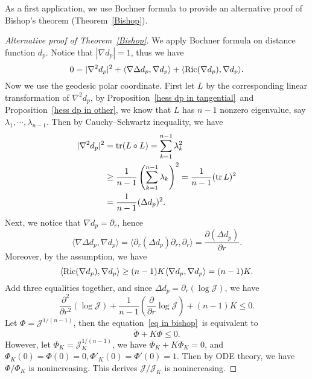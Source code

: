 As a first application, we use Bochner formula to provide an alternative proof of Bishop's theorem (Theorem~\ref{Bishop}).
\begin{proof}[Alternative proof of Theorem~\ref{Bishop}]
    We apply Bochner formula on distance function $d_p$.
    Notice that $|\nabla d_p|=1$, thus we have
    \[0=|\nabla^2d_p|^2+\langle\nabla\Delta d_p,\nabla d_p\rangle+\langle\operatorname{Ric}(\nabla d_p),\nabla d_p\rangle.\]
    Now we use the geodesic polar coordinate.
    First let $L$ by the corresponding linear transformation of $\nabla^2d_p$, by Proposition~\ref{hess dp in tangential}~and Proposition~\ref{hess dp in other}, we know that $L$ has $n-1$ nonzero eigenvalue, say $\lambda_1,\cdots,\lambda_{n-1}$.
    Then by Cauchy--Schwartz inequality, we have
    \begin{align*}
        |\nabla^2d_p|^2&=\operatorname{tr}(L\circ L)=\sum_{k=1}^{n-1}\lambda^2_k\\
        &\geq\frac{1}{n-1}\left(\sum_{k=1}^{n-1}\lambda_k\right)^2=\frac{1}{n-1}(\operatorname{tr} L)^2\\
        &=\frac{1}{n-1}(\Delta d_p)^2.
    \end{align*}
    Next, we notice that $\nabla d_p=\partial_r$, hence
    \[\langle\nabla\Delta d_p,\nabla d_p\rangle=\langle\partial_r(\Delta d_p)\partial_r,\partial_r\rangle=\frac{\partial(\Delta d_p)}{\partial{r}}.\]
    Moreover, by the assumption, we have
    \[\langle\operatorname{Ric}(\nabla d_p),\nabla d_p\rangle\geq(n-1)K\langle\nabla d_p,\nabla d_p\rangle=(n-1)K.\]
    Add three equalities together, and since $\Delta d_p=\partial_r(\log\mathscr{J})$, we have
    \begin{equation}
        \frac{\partial^2{}}{\partial{r^2}}(\log\mathscr{J})+\frac{1}{n-1}\left(\frac{\partial{}}{\partial{r}}\log\mathscr{J}\right)+(n-1)K\leq 0.\label{eq in bishop}
    \end{equation}
    Let $\Phi=\mathscr{J}^{1/(n-1)}$, then the equation~\eqref{eq in bishop}~is equivalent to
    \[\ddot{\Phi}+K\Phi\leq 0.\]
    However, let $\Phi_K=\mathscr{J}_K^{1/(n-1)}$, we have $\ddot{\Phi}_K+K\Phi_K=0$, and $\Phi_K(0)=\Phi(0)=0, \Phi'_K(0)=\Phi'(0)=1$.
    Then by ODE theory, we have $\Phi/\Phi_K$ is nonincreasing.
    This derives $\mathscr{J}/\mathscr{J}_K$ is nonincreasing.
\end{proof}